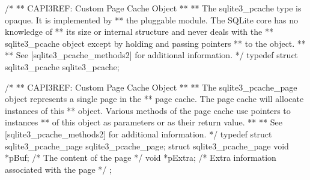\begin{Codex}[label=sqlite3.h,numbers=left]
{/*
** CAPI3REF: Custom Page Cache Object
**
** The sqlite3_pcache type is opaque.  It is implemented by
** the pluggable module.  The SQLite core has no knowledge of
** its size or internal structure and never deals with the
** sqlite3_pcache object except by holding and passing pointers
** to the object.
**
** See [sqlite3_pcache_methods2] for additional information.
*/
typedef struct sqlite3_pcache sqlite3_pcache;

/*
** CAPI3REF: Custom Page Cache Object
**
** The sqlite3_pcache_page object represents a single page in the
** page cache.  The page cache will allocate instances of this
** object.  Various methods of the page cache use pointers to instances
** of this object as parameters or as their return value.
**
** See [sqlite3_pcache_methods2] for additional information.
*/
typedef struct sqlite3_pcache_page sqlite3_pcache_page;
struct sqlite3_pcache_page {
  void *pBuf;        /* The content of the page */
  void *pExtra;      /* Extra information associated with the page */
};

}
\end{Codex}
